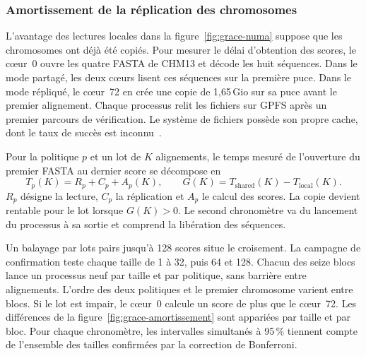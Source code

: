 
\subsubsection{Amortissement de la réplication des chromosomes}\label{sec:grace-amortissement}
L’avantage des lectures locales dans la figure~\ref{fig:grace-numa} suppose que les chromosomes ont déjà été copiés. Pour mesurer le délai d’obtention des scores, le cœur~0 ouvre les quatre FASTA de CHM13 et décode les huit séquences. Dans le mode partagé, les deux cœurs lisent ces séquences sur la première puce. Dans le mode répliqué, le cœur~72 en crée une copie de 1,65\,Gio sur sa puce avant le premier alignement. Chaque processus relit les fichiers sur GPFS après un premier parcours de vérification. Le système de fichiers possède son propre cache, dont le taux de succès est inconnu~\cite{gpfs-pagepool}.

Pour la politique \(p\) et un lot de \(K\) alignements, le temps mesuré de l’ouverture du premier FASTA au dernier score se décompose en
\[
 T_p(K)=R_p+C_p+A_p(K),\qquad
 G(K)=T_{\mathrm{shared}}(K)-T_{\mathrm{local}}(K).
\]
\(R_p\) désigne la lecture, \(C_p\) la réplication et \(A_p\) le calcul des scores. La copie devient rentable pour le lot lorsque \(G(K)>0\). Le second chronomètre va du lancement du processus à sa sortie et comprend la libération des séquences.

Un balayage par lots pairs jusqu’à 128 scores situe le croisement. La campagne de confirmation teste chaque taille de 1 à 32, puis 64 et 128. Chacun des seize blocs lance un processus neuf par taille et par politique, sans barrière entre alignements. L’ordre des deux politiques et le premier chromosome varient entre blocs. Si le lot est impair, le cœur~0 calcule un score de plus que le cœur~72. Les différences de la figure~\ref{fig:grace-amortissement} sont appariées par taille et par bloc. Pour chaque chronomètre, les intervalles simultanés à 95\,\% tiennent compte de l’ensemble des tailles confirmées par la correction de Bonferroni.


